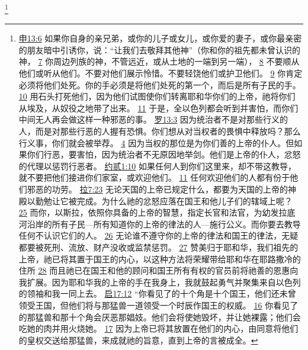 \documentclass[12pt, a4paper, oneside]{ctexart}
\begin{document}
	\footnote {
		\href{https://biblehub.com/deuteronomy/13-6.htm}{申13:6} 如果你自身的亲兄弟，或你的儿子或女儿，或你爱的妻子，或你最亲密的朋友暗中引诱你，说：“让我们去敬拜其他神”（你和你的祖先都未曾认识的神，
		\href{https://biblehub.com/deuteronomy/13-7.htm}{7} 你周边列族的神，不管远近，或从土地的一端到另一端），
		\href{https://biblehub.com/deuteronomy/13-8.htm}{8} 不要顺从他们或听从他们。不要对他们展示怜惜。不要轻饶他们或护卫他们。
		\href{https://biblehub.com/deuteronomy/13-9.htm}{9} 你肯定必须将他们处死。你的手必须是将他们处死的第一个，而后是所有子民的手。
		\href{https://biblehub.com/deuteronomy/13-10.htm}{10} 用石头打死他们，因为他们试图使你们转离耶和华你们的上帝，祂将你们从埃及，从奴役之地带了出来。
		\href{https://biblehub.com/deuteronomy/13-11.htm}{11} 于是，全以色列都会听到并害怕，而你们中间无人再会做这样一种邪恶的事。
		\href{https://biblehub.com/romans/13-3.htm}{罗13:3} 因为统治者不是对那些行义的人，而是对那些行恶的人握有恐惧。你们想从对当权者的畏惧中释放吗？那么行义事，你们就会被举荐。
		\href{https://biblehub.com/romans/13-4.htm}{4} 因为当权的那位是为你们善的上帝的仆人。但如果你们行恶，要害怕，因为统治者不无原因地举剑。他们是上帝的仆人，忿怒的代理以惩罚行恶者。
		\href{https://biblehub.com/2_john/1-10.htm}{约贰1:10} 如果任何人到你们这里来，却不带这教导，就不要把他们接进你们家室，或欢迎他们。
		\href{https://biblehub.com/2_john/1-11.htm}{11} 任何欢迎他们的人都有份于他们邪恶的功劳。
		\href{https://biblehub.com/ezra/7-23.htm}{拉7:23} 无论天国的上帝已规定什么，都要为天国的上帝的神殿以勤勉让它被完成。为什么祂的忿怒应落在国王和他儿子们的辖域上呢？
		\href{https://biblehub.com/ezra/7-25.htm}{25} 而你，以斯拉，依照你具备的上帝的智慧，指定长官和法官，为幼发拉底河沿岸的所有子民---所有知道你的上帝的律法的人---施行公义。而你要去教导任何不认识它们的人。
		\href{https://biblehub.com/ezra/7-26.htm}{26} 无论谁不遵守你的上帝的律法和国王的律法，无疑都要被死刑、流放、财产没收或监禁惩罚。
		\href{https://biblehub.com/ezra/7-27.htm}{27} 赞美归于耶和华，我们祖先的上帝，祂已将其置于国王的内心，以这种方法将荣耀带给耶和华在耶路撒冷的住所
		\href{https://biblehub.com/ezra/7-28.htm}{28} 而且祂已在国王和他的顾问和国王所有有权的官员前将祂善的恩惠向我扩展。因为耶和华我的上帝的手在我身上，我就鼓起勇气并聚集来自以色列的领袖和我一同上去。
		\href{https://biblehub.com/revelation/17-12.htm}{启17:12} “你看见了的十个角是十个国王，他们还未曾领受王国，但他们将与那猛兽一道领受一个时辰作国王的权威。
		\href{https://biblehub.com/revelation/17-16.htm}{16} 你看见了的那猛兽和那十个角会厌恶那娼妓。他们会将使她毁坏，并让她裸露；他们会吃她的肉并用火烧她。
		\href{https://biblehub.com/revelation/17-17.htm}{17} 因为上帝已将其放置在他们的内心，由同意将他们的皇权交送给那猛兽，来成就祂的旨意，直到上帝的言被成全。
}
\end{document}
